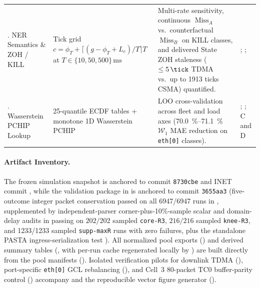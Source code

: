 \documentclass[11pt,a4paper]{article}
\newcommand{\MissA}{\ensuremath{\operatorname{Miss}_A}}
\newcommand{\MissB}{\ensuremath{\operatorname{Miss}_B}}
\newcommand{\Wone}{\ensuremath{\mathcal{W}_1}}
\begin{document}
\begin{table}[!tb]
\begin{tabularx}{\textwidth}{P{2.6cm} P{3.6cm} Y P{2.6cm}}
. NER Semantics \& ZOH / KILL & Tick grid $c = \phi_T + \lceil(g-\phi_T+L_c)/T\rceil T$ at $T \in \{10,50,500\}\,\text{ms}$ & Multi-rate sensitivity, continuous $\MissA$ vs.\ counterfactual $\MissB$ on KILL classes, and delivered State ZOH staleness ($\le \qty{5}{\tick}$ TDMA vs.\ up to \num{1913} ticks CSMA) quantified. & ; ;  \\
. Wasserstein PCHIP Lookup & 25-quantile ECDF tables + monotone 1D Wasserstein PCHIP & LOO cross-validation across fleet and load axes (\qtyrange{70.0}{71.1}{\percent} $\Wone$ MAE reduction on \texttt{eth[0]} classes). & ; ; C and D \\
\bottomrule
\end{tabularx}
\end{table}

\paragraph{Artifact Inventory.}
The frozen simulation snapshot is anchored to commit \texttt{8730cbe} and INET commit , while the validation package in  is anchored to commit \texttt{3655aa3} (five-outcome integer packet conservation passed on all \num{6947}/\num{6947} runs in , supplemented by independent-parser corner-plus-10\%-sample scalar and domain-delay audits in  passing on $202/202$ sampled \texttt{core-R3}, $216/216$ sampled \texttt{knee-R3}, and \num{1233}/\num{1233} sampled \texttt{supp-maxR} runs with zero failures, plus the standalone PASTA ingress-serialization test ). All normalized pool exports () and derived summary tables (, with per-run cache  regenerated locally by ) are built directly from the pool manifests (). Isolated verification pilots for downlink TDMA (), port-specific \texttt{eth[0]} GCL rebalancing (), and Cell~3 80-packet TC0 buffer-parity control () accompany  and the reproducible vector figure generator  ().

\FloatBarrier

\printbibliography
\end{document}
